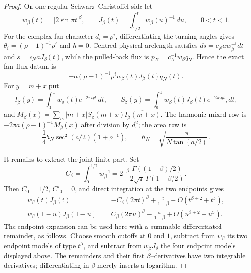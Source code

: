 \begin{proof}
On one regular Schwarz--Christoffel side let
\[
 w_\beta(t)=|2\sin\pi t|^\beta,\qquad
 J_\beta(t)=\int_{1/2}^t w_\beta(u)^{-1}\,du,\qquad 0<t<1.
\]
For the complex fan character $d_i=\rho^i$, differentiating the turning
angles gives $\dot\theta_i=(\rho-1)^{-1}\rho^i$ and $\dot h=0$.
Centred physical arclength satisfies
$ds=c_Naw_\beta^{-1}dt$ and $s=c_NaJ_\beta(t)$, while the pulled-back
flux is $p_N=c_N^{-1}w_\beta q_N$.  Hence the exact fan--flux datum is
\[
 -a(\rho-1)^{-1}\rho^i w_\beta(t)J_\beta(t)q_N(t).
\]
For $y=m+x$ put
\[
 I_\beta(y)=\int_0^1w_\beta(t)e^{-2\pi iyt}\,dt,\qquad
 S_\beta(y)=\int_0^1w_\beta(t)J_\beta(t)e^{-2\pi iyt},dt,
\]
and $M_\beta(x)=\sum_m|m+x|S_\beta(m+x)\overline{I_\beta(m+x)}$.
The harmonic mixed row is
$-2\pi a(\rho-1)^{-1}M_\beta(x)$ after division by $d_\circ^2$; the area
row is
\[
 \frac14h_N\sec^2(a/2)(1+\rho^{-1}),\qquad
 h_N=\sqrt{\frac\pi{N\tan(a/2)}}.
\]

It remains to extract the joint finite part.  Set
\[
 C_\beta=\int_0^{1/2}w_\beta^{-1}
 =2^{-\beta}\frac{\Gamma((1-\beta)/2)}
 {2\sqrt\pi\,\Gamma(1-\beta/2)}.
\]
Then $C_0=1/2$, $C'_0=0$, and direct integration at the two endpoints
gives
\begin{align*}
 w_\beta(t)J_\beta(t)
 &=-C_\beta(2\pi t)^\beta+\frac{t}{1-\beta}
   +O(t^{\beta+2}+t^3),\\
 w_\beta(1-u)J_\beta(1-u)
 &= C_\beta(2\pi u)^\beta-\frac{u}{1-\beta}
   +O(u^{\beta+2}+u^3).
\end{align*}
The endpoint expansion can be used here with a summable differentiated
remainder, as follows.  Choose smooth cutoffs at $0$ and $1$, subtract
from $w_\beta$ its two endpoint models of type $t^\beta$, and subtract
from $w_\beta J_\beta$ the four endpoint models displayed above.  The
remainders and their first $\beta$--derivatives have two integrable
derivatives; differentiating in $\beta$ merely inserts a logarithm.


\end{proof}
